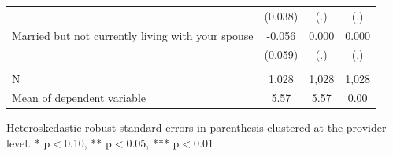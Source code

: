 \documentclass{beamer}
\begin{document}
\begin{frame}[plain]
\begin{table}[htbp]
\begin{center}
\begin{threeparttable}
\begin{tabular}{l*{3}{c}}
                    									&     (0.038)   &         (.)   &         (.) \\
Married but not currently living with your spouse	&      -0.056   &       0.000   &       0.000 \\
                    									&     (0.059)   &         (.)   &         (.) \\
\\
N                   									&       1,028   &       1,028   &       1,028\\
Mean of dependent variable								&        5.57   &        5.57   &        0.00\\
\bottomrule
\end{tabular}
\begin{tablenotes}
\tiny
\item Heteroskedastic robust standard errors in parenthesis clustered at the provider level. * p$<$0.10, ** p$<$0.05, *** p$<$0.01
\end{tablenotes}
\end{threeparttable}
\end{center}
\end{table}

\end{frame}
\end{document}
